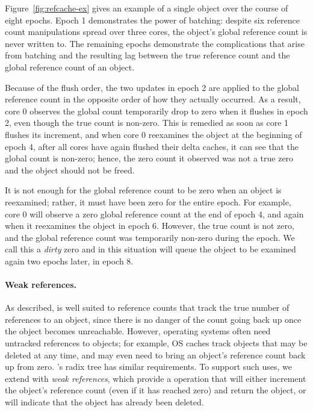 Figure~\ref{fig:refcache-ex} gives an example of a single object over
the course of eight epochs.  Epoch 1 demonstrates the power of
batching: despite six reference count manipulations spread over three
cores, the object's global reference count is never written to.  The
remaining epochs demonstrate the complications that arise from
batching and the resulting lag between the true reference count and
the global reference count of an object.

Because of the flush order, the two updates in epoch 2 are applied to
the global reference count in the opposite order of how they actually
occurred.  As a result, core 0 observes the global count temporarily
drop to zero when it flushes in epoch 2, even though the true count is
non-zero.  This is remedied as soon as core 1 flushes its increment,
and when core 0 reexamines the object at the beginning of epoch 4,
after all cores have again flushed their delta caches, it can see
that the global count is non-zero; hence, the zero count it observed
was not a true zero and the object should not be freed.

It is not enough for the global reference count to be zero when an
object is reexamined; rather, it must have been zero for the entire
epoch.  For example, core 0 will observe a zero global reference count
at the end of epoch 4, and again when it reexamines the object in
epoch 6.  However, the true count is not zero, and the global
reference count was temporarily non-zero during the epoch.  We call
this a \emph{dirty} zero and in this situation  will
queue the object to be examined again two epochs later, in epoch 8.

\paragraph{Weak references.}
As described,  is well suited to reference counts that track
the true number of references to an object, since there is no danger
of the count going back up once the object becomes unreachable.
However, operating systems often need untracked references to objects;
for example, OS caches track objects that may be deleted at any time,
and may even need to bring an object's reference count back up from
zero.  \vm's radix tree has similar requirements.  To support such
uses, we extend  with \emph{weak references}, which provide a
 operation that will either increment the object's
reference count (even if it has reached zero) and return the object,
or will indicate that the object has already been deleted.

